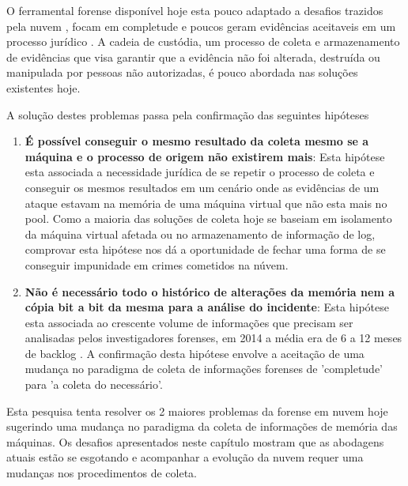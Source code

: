 \documentclass[12pt,				%
	openright,			%
	oneside,			%
	a4paper,			%
	english,			%
	brazil				%
	]{abntex2}
\begin{document}
O ferramental forense disponível hoje esta pouco adaptado a desafios trazidos pela nuvem \cite{Dykstra2012a}, focam em completude e poucos geram evidências aceitaveis em um 
processo jurídico \cite{Reichert2015}. A cadeia de custódia, um processo de coleta e armazenamento de evidências que visa garantir que a evidência não foi alterada, destruída 
ou manipulada por pessoas não autorizadas, é pouco abordada nas soluções existentes hoje. 

A solução destes problemas passa pela confirmação das seguintes hipóteses

\begin{enumerate}
 \item \textbf{É possível conseguir o mesmo resultado da coleta mesmo se a máquina e o processo de origem não existirem mais}: Esta hipótese esta associada a necessidade jurídica de se 
 repetir o processo de coleta e conseguir os mesmos resultados em um cenário onde as evidências de um ataque estavam na memória de uma máquina virtual que não esta mais no pool.
 Como a maioria das soluções de coleta hoje se baseiam em isolamento da máquina virtual afetada ou no armazenamento de informação de log, comprovar esta hipótese nos dá
 a oportunidade de fechar uma forma de se conseguir impunidade em crimes cometidos na núvem.
 \item \textbf{Não é necessário todo o histórico de alterações da memória nem a cópia bit a bit da mesma para a análise do incidente}: Esta hipótese esta associada ao crescente
 volume de informações que precisam ser analisadas pelos investigadores forenses, em 2014 a média era de 6 a 12 meses de backlog \cite{Quick2014}. A confirmação desta hipótese
 envolve a aceitação de uma mudança no paradigma de coleta de informações forenses de 'completude' para 'a coleta do necessário'.
\end{enumerate}

Esta pesquisa tenta resolver os 2 maiores problemas da forense em nuvem hoje sugerindo uma mudança no paradigma da coleta de informações de memória das máquinas. Os desafios apresentados
neste capítulo mostram que as abodagens atuais estão se esgotando e acompanhar a evolução da nuvem requer uma mudanças nos procedimentos de coleta.
\end{document}
